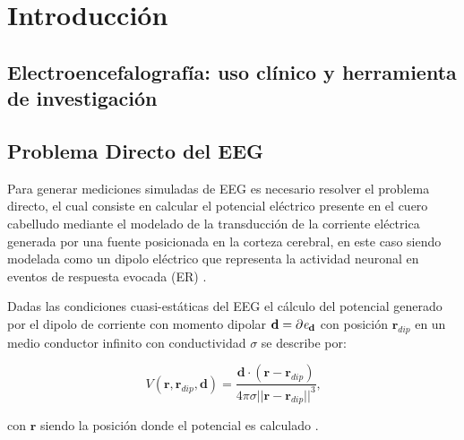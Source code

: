 %
\chapter{Introducción}
\label{sec:intro}




\section{Electroencefalografía: uso clínico y herramienta de investigación}

\section{Problema Directo del EEG}
\label{sec:methodology:direct}

Para generar mediciones simuladas de EEG es necesario resolver el problema directo, el cual consiste en calcular el potencial eléctrico presente en el cuero cabelludo mediante el modelado de la transducción de la corriente eléctrica generada por una fuente posicionada en la corteza cerebral, en este caso siendo modelada como un dipolo eléctrico que representa la actividad neuronal en eventos de respuesta evocada (ER) \cite{Mosher1999, Hallez2007}. 

Dadas las condiciones cuasi-estáticas del EEG \cite{Plonsey1967} el cálculo del potencial generado por el dipolo de corriente con momento dipolar $ \mathbf{d} = \partial\emph{e}_{\mathbf{d}}$ con posición $\mathbf{r}_{dip}$ en un medio conductor infinito con conductividad $\sigma$ se describe por:

\begin{equation}
	\label{fdip}
	V(\mathbf{r},\mathbf{r}_{dip},\mathbf{d})=\frac{\mathbf{d}\cdot(\mathbf{r}-\mathbf{r}_{dip})}{4\pi \sigma {||\mathbf{r}-\mathbf{r}_{dip}||}^{3}}\text{,}
\end{equation}

con $\mathbf{r}$ siendo la posición donde el potencial es calculado \cite{Hallez2007}.

